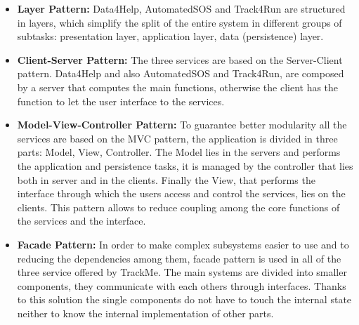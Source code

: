 \documentclass[a4paper]{article}
\begin{document}
\begin{itemize}
    \item \textbf{Layer Pattern:}
     Data4Help, AutomatedSOS and Track4Run are structured in layers, which simplify the split of the entire system in different groups of subtasks: presentation layer, application layer, data (persistence) layer.
     
    \item \textbf{Client-Server Pattern:} The three services are based on the Server-Client pattern. Data4Help and also AutomatedSOS and Track4Run, are composed by a server that computes the main functions, otherwise the client has the function to let the user interface to the services.
    
    \item \textbf{Model-View-Controller Pattern:} To guarantee better modularity all the services are based on the MVC pattern, the application is divided in three parts: Model, View, Controller. The Model lies in the servers and performs the application and persistence tasks, it is managed by the controller that lies both in server and in the clients. Finally the View, that performs the interface through which the users access and control the services, lies on the clients. This pattern allows to reduce coupling among the core functions of the services and the interface.
    
    \item \textbf{Facade Pattern:} In order to make complex subsystems easier to use and to reducing the dependencies among them, facade pattern is used in all of the three service offered by TrackMe. The main systems are divided into smaller components, they communicate with each others through interfaces. Thanks to this solution the single components do not have to touch the internal state neither to know the internal implementation of other parts.
    
\end{itemize}
\end{document}
